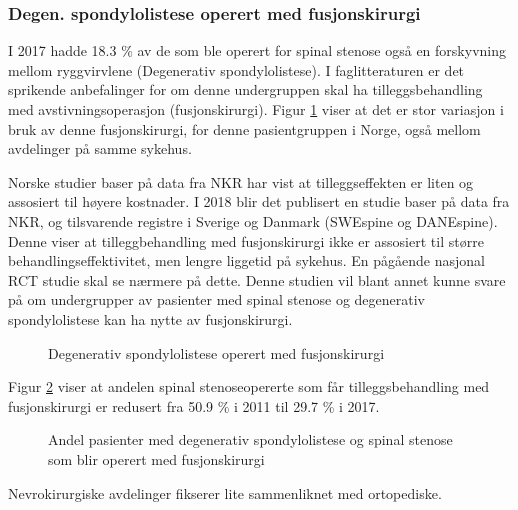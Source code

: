 \documentclass [norsk,a4paper,twoside]{article}\usepackage[]{graphicx}\usepackage[]{color}
\begin{document}



\subsubsection{Degen. spondylolistese operert med fusjonskirurgi}


I 2017 hadde 18.3 \% av de som ble operert for spinal stenose  også en forskyvning mellom ryggvirvlene (Degenerativ spondylolistese). I faglitteraturen er det sprikende anbefalinger for om denne undergruppen skal ha tilleggsbehandling med avstivningsoperasjon (fusjonskirurgi).
Figur \ref{fig:degSponFusj} viser at det er stor variasjon i bruk av denne fusjonskirurgi, 
for denne pasientgruppen i Norge, også mellom avdelinger på samme sykehus. 

Norske studier baser på data fra NKR har vist at tilleggseffekten er liten og assosiert til høyere kostnader. 
I 2018 blir det publisert en studie baser på data fra NKR, og tilsvarende registre i Sverige og Danmark (SWEspine og DANEspine). Denne viser  at tilleggbehandling med fusjonskirurgi ikke er assosiert til større behandlingseffektivitet, men lengre liggetid på sykehus. En pågående nasjonal RCT studie skal se nærmere på dette. Denne studien vil blant annet kunne svare på om undergrupper av pasienter med spinal stenose og degenerativ spondylolistese kan ha nytte av fusjonskirurgi.

\begin{figure}[ht]
\caption{\label{fig:degSponFusj} Degenerativ spondylolistese operert med fusjonskirurgi}
\end{figure}

Figur \ref{fig:degSponFusjSStid} viser at andelen spinal stenoseopererte som får 
tilleggsbehandling med fusjonskirurgi er redusert fra 50.9 \% 
i 2011 til 29.7 \% i 2017.


\begin{figure}[ht]
\caption{\label{fig:degSponFusjSStid} Andel pasienter med degenerativ spondylolistese og spinal stenose som blir operert med fusjonskirurgi}
\end{figure}

Nevrokirurgiske avdelinger fikserer lite sammenliknet med ortopediske.
\end{document}
